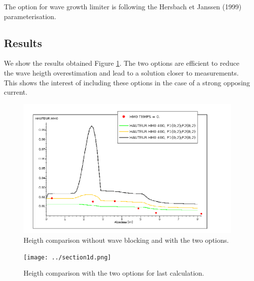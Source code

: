 The option for wave growth limiter is following the Hersbach et Janssen (1999) parameterisation.

%
%
\subsection{Results}
%
We show the results obtained Figure \ref{reswaveblocking}. The two options are efficient to reduce the wave heigth overestimation and lead to a solution closer to measurements. This shows the interest of including these options in the case of a strong opposing current.

\begin{figure} [!h]
\centering
\includegraphics[scale = 0.4]{hauteur.png}
 \caption{Heigth comparison without wave blocking and with the two options.}
\label{reswaveblocking}
\end{figure}

\begin{figure} [!h]
\centering
\texttt{[image: ../section1d.png]}
 \caption{Heigth comparison with the two options for last calculation.}
\label{reswaveblocking2}
\end{figure}



